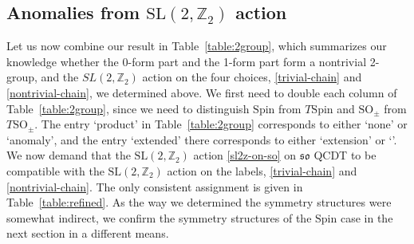\documentclass[12pt]{article}
\numberwithin{equation}{section}
\def\bZ{\mathbb{Z}}
\def\SO{\mathrm{SO}}
\def\so{\mathfrak{so}}
\def\Spin{\mathrm{Spin}}
\def\SL{\mathrm{SL}}
\begin{document}
\subsection{Anomalies from $\SL(2,\bZ_2)$ action} 

Let us now combine our result in Table~\ref{table:2group},
which summarizes our knowledge whether the 0-form part and the 1-form part form a nontrivial 2-group,
and the $SL(2,\bZ_2)$ action on the four choices, \eqref{trivial-chain} and \eqref{nontrivial-chain}, we determined above.
We first need to double each column of Table~\ref{table:2group},
since we need to distinguish $\Spin$ from $T\Spin$ and $\SO_\pm$ from $T\SO_\pm$.
The entry `product' in Table~\ref{table:2group} corresponds to either `none' or `anomaly',
and the entry `extended' there corresponds to either `extension' or `\Textended'.
We now demand that the $\SL(2,\bZ_2)$ action \eqref{sl2z-on-so} on $\so$ QCDT to be compatible with the $\SL(2,\bZ_2)$ action on the labels, \eqref{trivial-chain} and \eqref{nontrivial-chain}.
The only consistent assignment is given in Table~\ref{table:refined}.
As the way we determined the symmetry structures were somewhat indirect,
we confirm the symmetry structures of the $\Spin$ case in the next section
in a different means.
\end{document}
